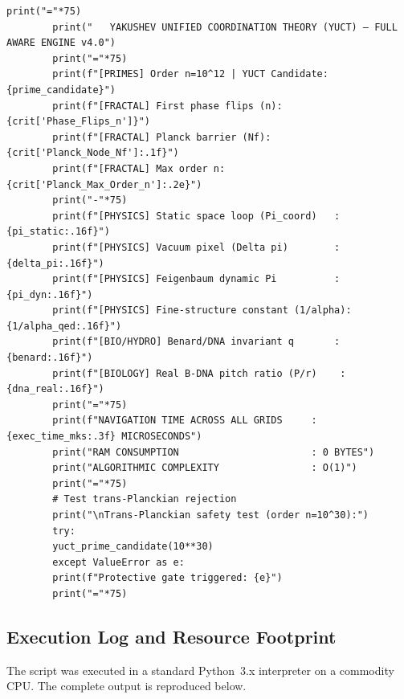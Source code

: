 \documentclass[12pt,a4paper]{article}
\begin{document}
\begin{lstlisting}[caption={Complete YUCT coordination engine v4.0 (\texttt{yuct\_constants.py}).}, label={lst:yuct-engine}]
		print("="*75)
		print("   YAKUSHEV UNIFIED COORDINATION THEORY (YUCT) — FULL AWARE ENGINE v4.0")
		print("="*75)
		print(f"[PRIMES] Order n=10^12 | YUCT Candidate: {prime_candidate}")
		print(f"[FRACTAL] First phase flips (n): {crit['Phase_Flips_n']}")
		print(f"[FRACTAL] Planck barrier (Nf): {crit['Planck_Node_Nf']:.1f}")
		print(f"[FRACTAL] Max order n: {crit['Planck_Max_Order_n']:.2e}")
		print("-"*75)
		print(f"[PHYSICS] Static space loop (Pi_coord)   : {pi_static:.16f}")
		print(f"[PHYSICS] Vacuum pixel (Delta pi)        : {delta_pi:.16f}")
		print(f"[PHYSICS] Feigenbaum dynamic Pi          : {pi_dyn:.16f}")
		print(f"[PHYSICS] Fine-structure constant (1/alpha): {1/alpha_qed:.16f}")
		print(f"[BIO/HYDRO] Benard/DNA invariant q       : {benard:.16f}")
		print(f"[BIOLOGY] Real B-DNA pitch ratio (P/r)    : {dna_real:.16f}")
		print("="*75)
		print(f"NAVIGATION TIME ACROSS ALL GRIDS     : {exec_time_mks:.3f} MICROSECONDS")
		print("RAM CONSUMPTION                       : 0 BYTES")
		print("ALGORITHMIC COMPLEXITY                : O(1)")
		print("="*75)
		# Test trans-Planckian rejection
		print("\nTrans-Planckian safety test (order n=10^30):")
		try:
		yuct_prime_candidate(10**30)
		except ValueError as e:
		print(f"Protective gate triggered: {e}")
		print("="*75)
	\end{lstlisting}
	
	\subsection{Execution Log and Resource Footprint}
	
	The script was executed in a standard Python~3.x interpreter on a commodity CPU. The complete output is reproduced below.
	
\end{document}
